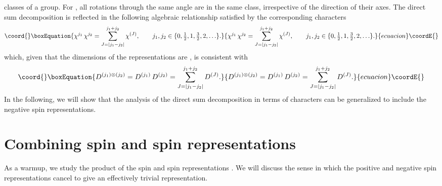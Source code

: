 \documentclass[a4paper,dvips,12pt]{article}
\providecommand {\half} {{1 \over 2}}
\providecommand {\hhalf} {{\textstyle{1 \over 2}}}
\begin{document}
    classes of a group.  For \coordHE{},
    all rotations through the same angle \myHighlight{$\theta$}\coordHE{} are in the same class,
    irrespective of the direction of their axes.  The direct sum
    decomposition is reflected in the following algebraic
    relationship satisfied by the corresponding characters
    \begin{equation}\coord{}\boxEquation{
        \chi^{{j_1}}\, \chi^{{j_2}} =
           \sum_{J = |j_1 - j_2|}^{j_1 + j_2} \chi^{(J)}, \qquad
          j_1, j_2 \in \{0, \hhalf, 1,{\textstyle {3\over 2}},2,
             \ldots\}. \label{PRODCHARPOSITIVE}
    }{
        \chi^{{j_1}}\, \chi^{{j_2}} =
           \sum_{J = |j_1 - j_2|}^{j_1 + j_2} \chi^{(J)}, \qquad
          j_1, j_2 \in \{0, \hhalf, 1,{\textstyle {3\over 2}},2,
             \ldots\}. }{ecuacion}\coordE{}\end{equation}
    which, given that the dimensions of the representations are
    \coordHE{}, is consistent with
    \begin{equation}\coord{}\boxEquation{
        D^{(j_1)\otimes(j_2)} = D^{(j_1)}\, D^{(j_2)} = \sum_{J = |j_1 - j_2|}^{j_1 + j_2}
        D^{(J)}.
    }{
        D^{(j_1)\otimes(j_2)} = D^{(j_1)}\, D^{(j_2)} = \sum_{J = |j_1 - j_2|}^{j_1 + j_2}
        D^{(J)}.
    }{ecuacion}\coordE{}\end{equation}
    In the following, we will show that the analysis of the direct sum decomposition
    in terms of characters can be generalized to include the negative spin
    representations.

    \section{Combining spin \myHighlight{$\half$}\coordHE{} and spin \myHighlight{$-\half$}\coordHE{} representations}
    \label{HALFHALF}

    As a warmup, we study the product
    of the spin \myHighlight{$\half$}\coordHE{} and spin \myHighlight{$-\half$}\coordHE{} representations \cite{MYSELF}.
    We will discuss the
    sense in which the positive and negative spin representations cancel
    to give an effectively trivial representation.
\end{document}
